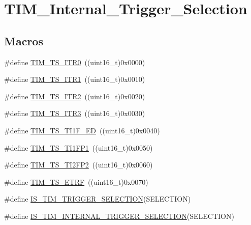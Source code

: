 \hypertarget{group___t_i_m___internal___trigger___selection}{}\section{T\+I\+M\+\_\+\+Internal\+\_\+\+Trigger\+\_\+\+Selection}
\label{group___t_i_m___internal___trigger___selection}
\subsection*{Macros}
\begin{DoxyCompactItemize}
\item 
\#define \mbox{\hyperlink{group___t_i_m___internal___trigger___selection_gab7cf2b7db3956d4fd1e5a5d84f4891e7}{T\+I\+M\+\_\+\+T\+S\+\_\+\+I\+T\+R0}}~((uint16\+\_\+t)0x0000)
\item 
\#define \mbox{\hyperlink{group___t_i_m___internal___trigger___selection_gad90fbca297153ca9c0112a67ea2c6cb3}{T\+I\+M\+\_\+\+T\+S\+\_\+\+I\+T\+R1}}~((uint16\+\_\+t)0x0010)
\item 
\#define \mbox{\hyperlink{group___t_i_m___internal___trigger___selection_ga8599ba58a5f911d648503c7ac55d4320}{T\+I\+M\+\_\+\+T\+S\+\_\+\+I\+T\+R2}}~((uint16\+\_\+t)0x0020)
\item 
\#define \mbox{\hyperlink{group___t_i_m___internal___trigger___selection_ga63183e611b91c5847040172c0069514d}{T\+I\+M\+\_\+\+T\+S\+\_\+\+I\+T\+R3}}~((uint16\+\_\+t)0x0030)
\item 
\#define \mbox{\hyperlink{group___t_i_m___internal___trigger___selection_ga8c89554efc693e679c94b5a749af123c}{T\+I\+M\+\_\+\+T\+S\+\_\+\+T\+I1\+F\+\_\+\+ED}}~((uint16\+\_\+t)0x0040)
\item 
\#define \mbox{\hyperlink{group___t_i_m___internal___trigger___selection_ga38d3514d54bcdb0ea8ac8bd91c5832b5}{T\+I\+M\+\_\+\+T\+S\+\_\+\+T\+I1\+F\+P1}}~((uint16\+\_\+t)0x0050)
\item 
\#define \mbox{\hyperlink{group___t_i_m___internal___trigger___selection_ga0ed58a269bccd3f22d19cc9a2ba3123f}{T\+I\+M\+\_\+\+T\+S\+\_\+\+T\+I2\+F\+P2}}~((uint16\+\_\+t)0x0060)
\item 
\#define \mbox{\hyperlink{group___t_i_m___internal___trigger___selection_gaece08e02e056613a882aa7ff0a6ccc2d}{T\+I\+M\+\_\+\+T\+S\+\_\+\+E\+T\+RF}}~((uint16\+\_\+t)0x0070)
\item 
\#define \mbox{\hyperlink{group___t_i_m___internal___trigger___selection_ga36e47cf625c695a368a68280e950dfbc}{I\+S\+\_\+\+T\+I\+M\+\_\+\+T\+R\+I\+G\+G\+E\+R\+\_\+\+S\+E\+L\+E\+C\+T\+I\+ON}}(S\+E\+L\+E\+C\+T\+I\+ON)
\item 
\#define \mbox{\hyperlink{group___t_i_m___internal___trigger___selection_ga1ce6c387021e2fdaf3fa3d7cd3eae962}{I\+S\+\_\+\+T\+I\+M\+\_\+\+I\+N\+T\+E\+R\+N\+A\+L\+\_\+\+T\+R\+I\+G\+G\+E\+R\+\_\+\+S\+E\+L\+E\+C\+T\+I\+ON}}(S\+E\+L\+E\+C\+T\+I\+ON)
\end{DoxyCompactItemize}


